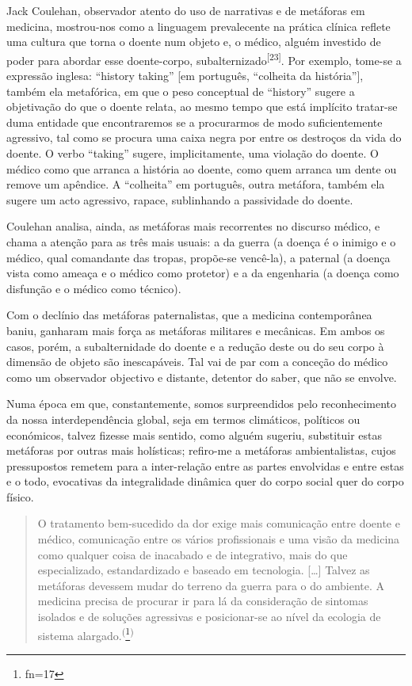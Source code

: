 \documentclass{article}
\makeatletter
\newcommand{\fn}{\afterassignment\fn@aux\count0=}
\newcommand{\fn@aux}{\csname fn\the\count0\endcsname}
\makeatother
\begin{document}
Jack Coulehan, observador atento do uso de narrativas e de metáforas em
medicina, mostrou-nos como a linguagem prevalecente na prática clínica reflete
uma cultura que torna o doente num objeto e, o médico, alguém investido de poder
para abordar esse doente-corpo,
subalternizado\textsuperscript{[}\textsuperscript{23}\textsuperscript{]}. Por exemplo, tome-se a expressão inglesa: “history taking” [em português,
“colheita da história”], também ela metafórica, em que o peso conceptual de
“history” sugere a objetivação do que o doente relata, ao mesmo tempo que está
implícito tratar-se duma entidade que encontraremos se a procurarmos de modo
suficientemente agressivo, tal como se procura uma caixa negra por entre os
destroços da vida do doente. O verbo “taking” sugere, implicitamente, uma
violação do doente. O médico como que arranca a história ao doente, como quem
arranca um dente ou remove um apêndice. A “colheita” em português, outra
metáfora, também ela sugere um acto agressivo, rapace, sublinhando a passividade
do doente.

Coulehan analisa, ainda, as metáforas mais recorrentes no discurso médico, e
chama a atenção para as três mais usuais: a da guerra (a doença é o inimigo e o
médico, qual comandante das tropas, propõe-se vencê-la), a paternal (a doença
vista como ameaça e o médico como protetor) e a da engenharia (a doença como
disfunção e o médico como técnico).

Com o declínio das metáforas paternalistas, que a medicina contemporânea baniu,
ganharam mais força as metáforas militares e mecânicas. Em ambos os casos,
porém, a subalternidade do doente e a redução deste ou do seu corpo à dimensão
de objeto são inescapáveis. Tal vai de par com a conceção do médico como um
observador objectivo e distante, detentor do saber, que não se envolve.

Numa época em que, constantemente, somos surpreendidos pelo reconhecimento da
nossa interdependência global, seja em termos climáticos, políticos ou
económicos, talvez fizesse mais sentido, como alguém sugeriu, substituir estas
metáforas por outras mais holísticas; refiro-me a metáforas ambientalistas,
cujos pressupostos remetem para a inter-relação entre as partes envolvidas e
entre estas e o todo, evocativas da integralidade dinâmica quer do corpo social
quer do corpo físico.
\begin{quote}

O tratamento bem-sucedido da dor exige mais comunicação entre doente e médico,
comunicação entre os vários profissionais e uma visão da medicina como qualquer
coisa de inacabado e de integrativo, mais do que especializado, estandardizado e
baseado em tecnologia. […] Talvez as metáforas devessem mudar do terreno da
guerra para o do ambiente. A medicina precisa de procurar ir para lá da
consideração de sintomas isolados e de soluções agressivas e posicionar-se ao
nível da ecologia de sistema alargado.\textsuperscript{(}\footnote{\fn17}\textsuperscript{)}

\end{quote}
\end{document}
